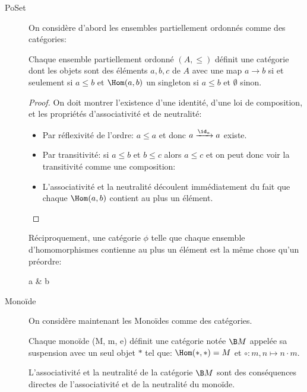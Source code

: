 \documentclass[math, info]{cours}
\begin{document}
\begin{exemple}
	\begin{description}
		\item[PoSet] On considère d'abord les ensembles partiellement ordonnés comme des catégories:
		      \begin{proposition}
			      Chaque ensemble partiellement ordonné $(A, \leq)$ définit une catégorie dont les objets sont des éléments $a, b, c$ de $A$
			      avec une map $a\to b$ si et seulement si $a \leq b$ et $\Hom(a, b)$ un singleton si $a\leq b$ et $\emptyset$ sinon.
			      \label{prop:posetcat}
		      \end{proposition}
		      \begin{proof}
			      On doit montrer l'existence d'une identité, d'une loi de composition, et les propriétés d'associativité et de neutralité:
			      \begin{itemize}
				      \item Par réflexivité de l'ordre: $a \leq a$ et donc $a \xrightarrow{\id_{a}} a$ existe.
				      \item Par transitivité: si $a \leq b$ et $b \leq c$ alors $a\leq c$ et on peut donc voir la transitivité comme une composition:
				      \item L'associativité et la neutralité découlent immédiatement du fait que chaque $\Hom(a, b)$ contient au plus un élément.
			      \end{itemize}
		      \end{proof}

		      Réciproquement, une catégorie $\phi$ telle que chaque ensemble d'homomorphismes contienne au plus un élément est la même chose qu'un préordre:
		      \begin{category}[]
			      a  &
			      b 
		      \end{category}

		\item[Monoïde] On considère maintenant les Monoïdes comme des catégories.
		      \begin{proposition}
			      Chaque monoïde (M, m, e) définit une catégorie notée $\B M$ appelée sa suspension avec un seul objet $*$ tel que:
			      $\Hom(*, *) = M$ et $\circ: m, n \mapsto n\cdot m$.
			      \label{prop:moncat}
		      \end{proposition}
		      L'associativité et la neutralité de la catégorie $\B M$ sont des conséquences directes de l'associativité et de la neutralité du monoïde.


\end{description}
\end{exemple}
\end{document}
